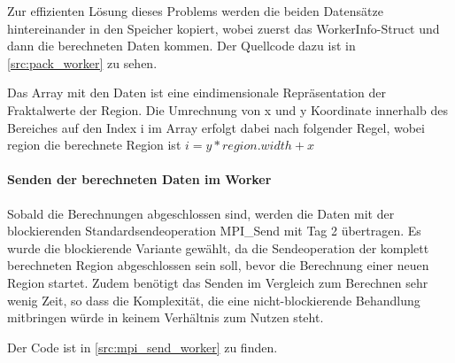 
Zur effizienten Lösung dieses Problems werden die beiden Datensätze hintereinander in den Speicher kopiert, wobei zuerst das WorkerInfo-Struct und dann die berechneten Daten kommen. Der Quellcode dazu ist in \autoref{src:pack_worker} zu sehen.

Das Array mit den Daten ist eine eindimensionale Repräsentation der Fraktalwerte der Region. Die Umrechnung von x und y Koordinate innerhalb des Bereiches auf den Index i im Array erfolgt dabei nach folgender Regel, wobei region die berechnete Region ist \quad $i = y * region.width + x$

\begin{figure}[h!]
	
\end{figure}

\paragraph{Senden der berechneten Daten im Worker}\label{para:send_worker}

Sobald die Berechnungen abgeschlossen sind, werden die Daten mit der blockierenden Standardsendeoperation MPI\_Send mit Tag 2 übertragen. Es wurde die blockierende Variante gewählt, da die Sendeoperation der komplett berechneten Region abgeschlossen sein soll, bevor die Berechnung einer neuen Region startet. Zudem benötigt das Senden im Vergleich zum Berechnen sehr wenig Zeit, so dass die Komplexität, die eine nicht-blockierende Behandlung mitbringen würde in keinem Verhältnis zum Nutzen steht.

Der Code ist in \autoref{src:mpi_send_worker} zu finden.

